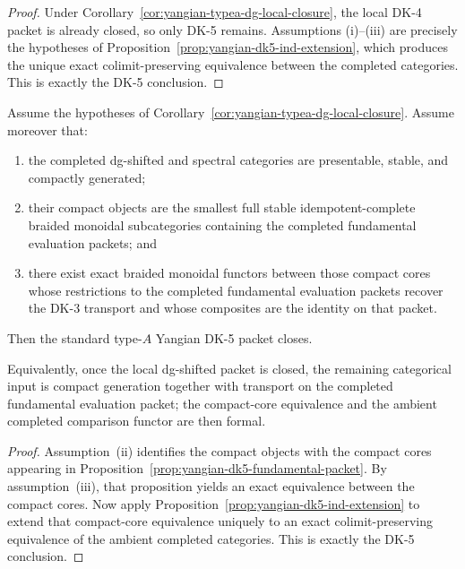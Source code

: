 \begin{proof}
Under
Corollary~\ref{cor:yangian-typea-dg-local-closure}, the local DK-4
packet is already closed, so only DK-5 remains.  Assumptions
\textup{(i)}--\textup{(iii)} are precisely the hypotheses of
Proposition~\ref{prop:yangian-dk5-ind-extension}, which produces the
unique exact colimit-preserving equivalence between the completed
categories.  This is exactly the DK-5 conclusion.
\end{proof}

\begin{corollary}
\label{cor:yangian-dk5-fundamental-packet}
Assume the hypotheses of
Corollary~\ref{cor:yangian-typea-dg-local-closure}.  Assume moreover
that:
\begin{enumerate}[label=\textup{(\roman*)}]
\item the completed dg-shifted and spectral categories are presentable,
  stable, and compactly generated;
\item their compact objects are the smallest full stable
  idempotent-complete braided monoidal subcategories containing the
  completed fundamental evaluation packets; and
\item there exist exact braided monoidal functors between those compact
  cores whose restrictions to the completed fundamental evaluation
  packets recover the DK-3 transport and whose composites are the
  identity on that packet.
\end{enumerate}
Then the standard type-$A$ Yangian DK-5 packet closes.

Equivalently, once the local dg-shifted packet is closed, the remaining
categorical input is compact generation together with transport on the
completed fundamental evaluation packet; the compact-core equivalence
and the ambient completed comparison functor are then formal.
\end{corollary}

\begin{proof}
Assumption~\textup{(ii)} identifies the compact objects with the
compact cores appearing in
Proposition~\ref{prop:yangian-dk5-fundamental-packet}.  By
assumption~\textup{(iii)}, that proposition yields an exact
equivalence between the compact cores.  Now apply
Proposition~\ref{prop:yangian-dk5-ind-extension} to extend that
compact-core equivalence uniquely to an exact colimit-preserving
equivalence of the ambient completed categories.  This is exactly the
DK-5 conclusion.
\end{proof}

